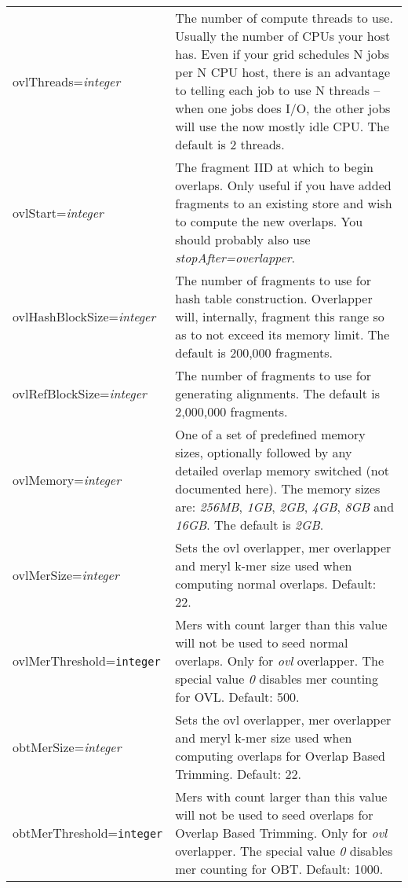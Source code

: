 \documentclass[twoside,11pt]{article}
\begin{document}
\begin{longtable}{lp{3.0in}}

ovlThreads={\it integer} &
The number of compute threads to use.  Usually the number of CPUs your
host has.  Even if your grid schedules N jobs per N CPU host, there is
an advantage to telling each job to use N threads -- when one jobs
does I/O, the other jobs will use the now mostly idle CPU.  The default is 2 threads.
\\

ovlStart={\it integer} &
The fragment IID at which to begin overlaps.  Only useful if you have
added fragments to an existing store and wish to compute the new
overlaps.  You should probably also use {\it stopAfter=overlapper}.
\\

ovlHashBlockSize={\it integer} &
The number of fragments to use for hash table construction.
Overlapper will, internally, fragment this range so as to not exceed
its memory limit.  The default is 200,000 fragments.
\\

ovlRefBlockSize={\it integer} &
The number of fragments to use for generating alignments.  The default
is 2,000,000 fragments.
\\

ovlMemory={\it integer} &
One of a set of predefined memory sizes, optionally followed by any
detailed overlap memory switched (not documented here).  The memory sizes are:
{\it 256MB}, {\it 1GB}, {\it 2GB}, {\it 4GB}, {\it 8GB} and {\it 16GB}.
The default is {\it 2GB}.
\\

ovlMerSize={\it integer} &
Sets the ovl overlapper, mer overlapper and meryl k-mer size used when
computing normal overlaps.  Default: 22.
\\

ovlMerThreshold={\tt integer} &
Mers with count larger than this value will not be used to seed
normal overlaps.  Only for {\em ovl} overlapper.  The special value {\it 0}
disables mer counting for OVL.  Default: 500.
\\

obtMerSize={\it integer} &
Sets the ovl overlapper, mer overlapper and meryl k-mer size used when
computing overlaps for Overlap Based Trimming.  Default: 22.
\\

obtMerThreshold={\tt integer} &
Mers with count larger than this value will not be used to seed
overlaps for Overlap Based Trimming.  Only for {\em ovl} overlapper.  The special value {\it 0}
disables mer counting for OBT.  Default: 1000.
\\
\end{longtable}
\end{document}
